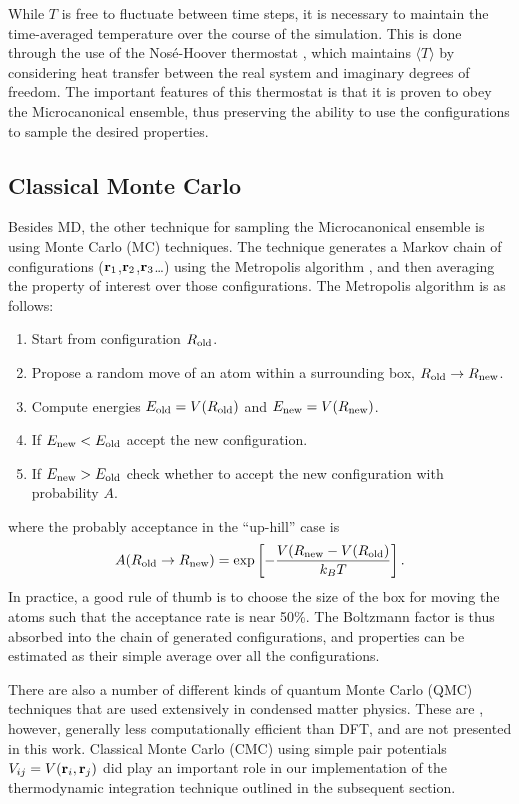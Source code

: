While $T$ is free to fluctuate between time steps, it is necessary to maintain the
time-averaged temperature over the course of the simulation. This is done through the
use of the Nos\'e-Hoover thermostat \citep{Nose1984}, which maintains $\langle T \rangle$ by
considering heat transfer between the real system and imaginary degrees of freedom.
The important features of this thermostat is that it is proven to obey the
Microcanonical ensemble, thus preserving the ability to use the configurations to
sample the desired properties.

\subsection{Classical Monte Carlo}

Besides MD, the other technique for sampling the Microcanonical ensemble is using
Monte Carlo (MC) techniques. The technique generates a Markov chain of
configurations (${\bf r}_1$,${\bf r}_2$,${\bf r}_3$\ldots) using the Metropolis
algorithm \citep{Metropolis1953}, and then averaging the property of interest over
those configurations. The Metropolis algorithm is as follows:
%
\begin{enumerate}
    \item Start from configuration $R_{\rm old}$.
    \item Propose a random move of an atom within a surrounding box, $R_{\rm old} \to
        R_{\rm new}$.
    \item Compute energies $E_{\rm old}=V(R_{\rm old})$ and $E_{\rm new}=V(R_{\rm
        new})$.
    \item If $E_{\rm new}<E_{\rm old}$ accept the new configuration.
    \item If $E_{\rm new}>E_{\rm old}$ check whether to accept the new configuration
        with probability $A$.
\end{enumerate}
%
where the probably acceptance in the ``up-hill'' case is
%
\begin{equation}
    A(R_{\rm old}\to R_{\rm new}) = \exp\left[-\frac{V(R_{\rm new} - V(R_{\rm old})}
    {k_B T} \right].
\end{equation}
%
In practice, a good rule of thumb is to choose the size of the box for moving the
atoms such that the acceptance rate is near 50\%.  The Boltzmann factor is thus
absorbed into the chain of generated configurations, and properties can be estimated
as their simple average over all the configurations.

There are also a number of different kinds of quantum Monte Carlo (QMC) techniques that
are used extensively in condensed matter physics. These are , however, generally less
computationally efficient than DFT, and are not presented in this work. Classical
Monte Carlo (CMC) using simple pair potentials $V_{ij}=V({\bf r}_i,{\bf r}_j)$ did
play an important role in our implementation of the thermodynamic integration
technique outlined in the subsequent section.


